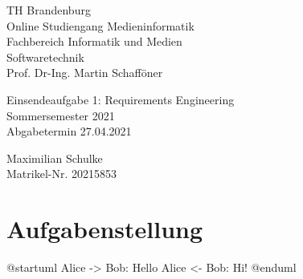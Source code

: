 \documentclass{article}
\begin{document}
\begin{titlepage}
	\begin{flushleft}
		TH Brandenburg \\
		Online Studiengang Medieninformatik \\
		Fachbereich Informatik und Medien \\
		Softwaretechnik \\
		Prof. Dr-Ing. Martin Schafföner
	\end{flushleft}

	\vfill

	\begin{center}
		\Large{Einsendeaufgabe 1: Requirements Engineering}\\[0.5em]
		\large{Sommersemester 2021}\\[0.25em]
		\large{Abgabetermin 27.04.2021}
	\end{center}

	\vfill

	\begin{flushright}
		Maximilian Schulke \\
		Matrikel-Nr. 20215853
	\end{flushright}
\end{titlepage}

\tableofcontents

\newpage

\section{Aufgabenstellung}

\begin{plantuml}
  @startuml
  Alice -> Bob: Hello
  Alice <- Bob: Hi!
  @enduml
\end{plantuml}
\end{document}
